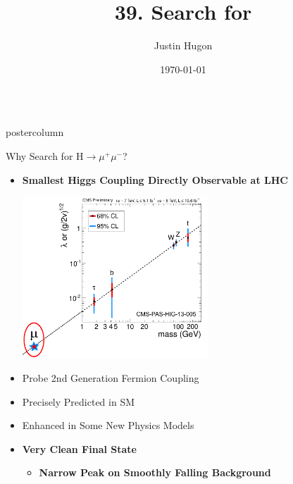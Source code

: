 \documentclass[final,hyperref={pdfpagelabels=false}]{beamer}
\title{39. Search for \hmm}
\author{Justin Hugon}
\institute{On Behalf of the CMS Collaboration}
\date{\today}
\newcommand{\hmm}{\ensuremath{\mathrm{H} \rightarrow \mu^+\mu^-}}
\newlength{\columnheight}
\begin{document}
\begin{frame}
  \begin{columns}
    \begin{column}{.49\textwidth}
      \begin{beamercolorbox}[center,wd=\textwidth]{postercolumn}
        \begin{minipage}[T]{.95\textwidth}  %
          \parbox[t][\columnheight]{\textwidth}{ %
            \begin{block}{\boldmath Why Search for \hmm{}?}
              \begin{itemize}
                \item \textbf{Smallest Higgs Coupling Directly Observable at LHC}
                \begin{center}
                  \includegraphics[width=0.55\textwidth]{other/myCouplingVMass3.pdf}
                \end{center}              
                \item Probe 2nd Generation Fermion Coupling
                \item Precisely Predicted in SM
                \item Enhanced in Some New Physics Models
                \item \textbf{Very Clean Final State}
                \begin{itemize}
                  \item \textbf{Narrow Peak on Smoothly Falling Background}

\end{itemize}
\end{itemize}
\end{block}}
\end{minipage}
\end{beamercolorbox}
\end{column}
\end{columns}
\end{frame}
\end{document}
